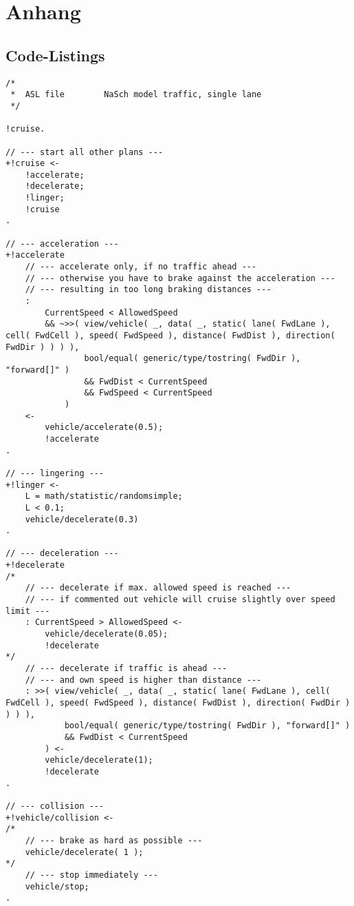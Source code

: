 \section{Anhang}


\newpage

\subsection{Code-Listings}

\begin{lstlisting}[style=asl, 
                   keywords={+!cruise,+!accelerate,+!linger,+!decelerate,+!vehicle/collision}, 
                   keywords={[2]}, 
                   keywords={[3]}, 
                   caption={Agentenscript: NaSch-Modell, einspurig},
                   label={lst:nasch}]      
/*
 *  ASL file        NaSch model traffic, single lane
 */

!cruise.

// --- start all other plans ---
+!cruise <-
    !accelerate;
    !decelerate;
    !linger;
    !cruise
.

// --- acceleration ---
+!accelerate
    // --- accelerate only, if no traffic ahead ---
    // --- otherwise you have to brake against the acceleration ---
    // --- resulting in too long braking distances ---
    : 
        CurrentSpeed < AllowedSpeed
        && ~>>( view/vehicle( _, data( _, static( lane( FwdLane ), cell( FwdCell ), speed( FwdSpeed ), distance( FwdDist ), direction( FwdDir ) ) ) ),
                bool/equal( generic/type/tostring( FwdDir ), "forward[]" )
                && FwdDist < CurrentSpeed
                && FwdSpeed < CurrentSpeed
            )
    <-
        vehicle/accelerate(0.5);
        !accelerate
.

// --- lingering ---
+!linger <-
    L = math/statistic/randomsimple;
    L < 0.1;
    vehicle/decelerate(0.3)
.

// --- deceleration ---
+!decelerate 
/*
    // --- decelerate if max. allowed speed is reached ---
    // --- if commented out vehicle will cruise slightly over speed limit ---
    : CurrentSpeed > AllowedSpeed <-
        vehicle/decelerate(0.05);
        !decelerate
*/
    // --- decelerate if traffic is ahead ---
    // --- and own speed is higher than distance ---
    : >>( view/vehicle( _, data( _, static( lane( FwdLane ), cell( FwdCell ), speed( FwdSpeed ), distance( FwdDist ), direction( FwdDir ) ) ) ), 
            bool/equal( generic/type/tostring( FwdDir ), "forward[]" ) 
            && FwdDist < CurrentSpeed
        ) <-
        vehicle/decelerate(1);
        !decelerate
.

// --- collision ---
+!vehicle/collision <-
/*
    // --- brake as hard as possible ---
    vehicle/decelerate( 1 );
*/
    // --- stop immediately ---
    vehicle/stop;
.\end{lstlisting}


